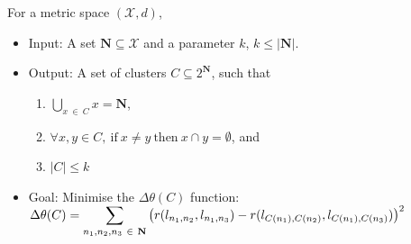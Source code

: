 For a metric space $(\mathcal{X}, d)$,
\begin{itemize}
    \item Input: A set $\textbf{N} \subseteq \mathcal{X}$ and a parameter $k$, $k \leq |\textbf{N}|$.
    \item Output: A set of clusters $C \subseteq 2^{\textbf{N}}$, such that
          \begin{enumerate}
              \item $\bigcup\limits_{x \ \in \ C}x = \textbf{N}$,
              \item $\forall x, y \in C, \ \text{if} \ x \neq y \ \text{then} \ x \cap y = \emptyset$, and
              \item $|C| \leq k$
          \end{enumerate}
    \item Goal: Minimise the $\Delta\theta(C)$ function:\smallbreak $\Delta\theta(C) = \mathlarger{\sum}\limits_{n_1, n_2, n_3 \ \in \ \textbf{N}} \left( r(l_{n_1,n_2}, l_{n_1,n_3}) - r(l_{C(n_1),C(n_2)}, l_{C(n_1),C(n_3)}) \right)^2$



\end{itemize}

